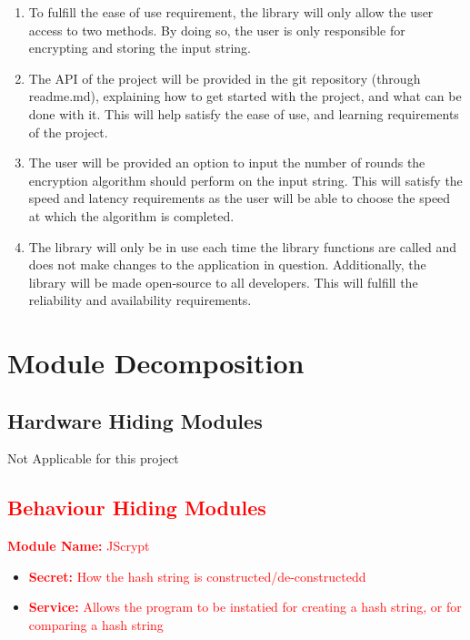\documentclass[12pt]{article}
\begin{document}
  \begin{enumerate}
    \item To fulfill the ease of use requirement, the library will only allow the user access to two methods. By doing so, the user is only responsible for encrypting and storing the input string.
    \item The API of the project will be provided in the git repository (through readme.md), explaining how to get started with the project, and what can be done with it. This will help satisfy the ease of use, and learning requirements of the project.
    \item The user will be provided an option to input the number of rounds the encryption algorithm should perform on the input string. This will satisfy the speed and latency requirements as the user will be able to choose the speed at which the algorithm is completed.
    \item The library will only be in use each time the library functions are called and does not make changes to the application in question. Additionally, the library will be made open-source to all developers. This will fulfill the reliability and availability requirements.


  \end{enumerate}

\section{Module Decomposition}

\subsection{Hardware Hiding Modules}

  Not Applicable for this project

\subsection{\textcolor{red}{Behaviour Hiding Modules}}

  \textcolor{red}{\textbf{Module Name:} JScrypt}
  \begin{itemize}
    \item \textcolor{red}{\textbf{Secret:} How the hash string is constructed/de-constructedd }
    \item \textcolor{red}{\textbf{Service:} Allows the program to be instatied for creating a hash string, or for comparing a hash string}
  \end{itemize}
\end{document}
